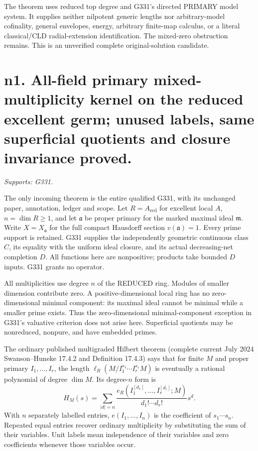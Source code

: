 \documentclass[11pt]{article}
\begin{document}
The theorem uses reduced top degree and G331's directed PRIMARY model system.
It supplies neither nilpotent generic lengths nor arbitrary-model cofinality,
general envelopes, energy, arbitrary finite-map calculus, or a literal
classical/CLD radial-extension identification. The mixed-zero obstruction
remains. This is an unverified complete original-solution candidate.

\section{n1. All-field primary mixed-multiplicity kernel on the reduced excellent germ; unused labels, same superficial quotients and closure invariance proved.}
\textit{Supports: G331.}

The only incoming theorem is the entire qualified G331, with its unchanged paper, annotation, ledger and scope. Let \(R=A_{\mathrm{red}}\) for excellent local \(A\), \(n=\dim R\ge1\), and let \(\mathfrak a\) be proper primary for the marked maximal ideal \(\mathfrak m\). Write \(X=X_{\mathfrak a}\) for the full compact Hausdorff section \(v(\mathfrak a)=1\). Every prime support is retained. G331 supplies the independently geometric continuous class \(C\), its equality with the uniform ideal closure, and its actual decreasing-net completion \(D\). All functions here are nonpositive; products take bounded \(D\) inputs. G331 grants no operator.

All multiplicities use degree \(n\) of the REDUCED ring. Modules of smaller dimension contribute zero. A positive-dimensional local ring has no zero-dimensional minimal component: its maximal ideal cannot be minimal while a smaller prime exists. Thus the zero-dimensional minimal-component exception in G331's valuative criterion does not arise here. Superficial quotients may be nonreduced, nonpure, and have embedded primes.

The ordinary published multigraded Hilbert theorem (complete current July 2024 Swanson--Huneke 17.4.2 and Definition 17.4.3) says that for finite \(M\) and proper primary \(I_1,\ldots,I_r\), the length \(\ell_R(M/I_1^{s_1}\cdots I_r^{s_r}M)\) is eventually a rational polynomial of degree \(\dim M\). Its degree-\(n\) form is
\[
H_M(s)=\sum_{|d|=n}\frac{e_R(I_1^{[d_1]},\ldots,I_r^{[d_r]};M)}{d_1!\cdots d_r!}s^d.
\]
With \(n\) separately labelled entries, \(e(I_1,\ldots,I_n)\) is the coefficient of \(s_1\cdots s_n\). Repeated equal entries recover ordinary multiplicity by substituting the sum of their variables. Unit labels mean independence of their variables and zero coefficients whenever those variables occur.
\end{document}
